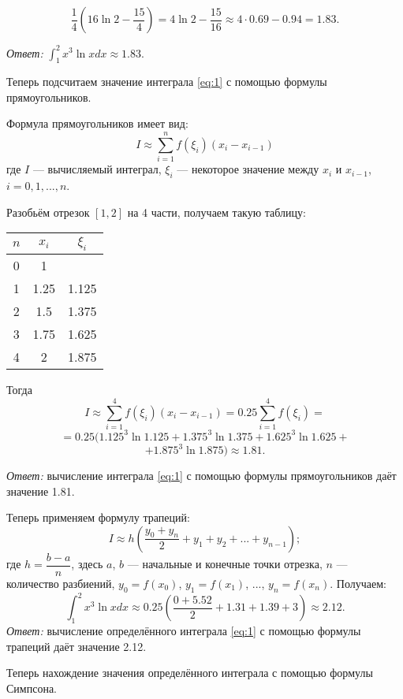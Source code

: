 \documentclass[a4paper, 12pt]{article}
\begin{document}
\begin{enumerate}
{    $$
    \dfrac {1} {4} \left ( 16 \ln 2 - \dfrac {15} {4} \right ) = 4 \ln 2 - \dfrac {15} {16} \approx 4 \cdot 0.69 - 0.94 = 1.83.
    $$

    \emph{Ответ:} $\int_1^2x^3 \ln{x} dx \approx 1.83$.

    Теперь подсчитаем значение интеграла \eqref{eq:1} с помощью формулы прямоугольников.

    Формула прямоугольников имеет вид:
    $$
    I \approx \sum_{i=1}^n f(\xi_i)(x_i - x_{i-1})
    $$
    где $I$ --- вычисляемый интеграл, $\xi_i$ --- некоторое значение между $x_i$ и $x_{i-1}$, $i=0,1,...,n$.

    Разобьём отрезок $[1,2]$ на 4 части, получаем такую таблицу:

    \begin{center}
    \begin{tabular}{|c|c|c|}
      \hline
      $n$ & $x_i$ & $\xi_i$ \\ \hline
      0 & 1 &  \\ \hline
      1 & 1.25 & 1.125 \\ \hline
      2 & 1.5 & 1.375 \\ \hline
      3 & 1.75 & 1.625 \\ \hline
      4 & 2 & 1.875 \\ \hline
    \end{tabular}
    \end{center}

    Тогда
    $$I \approx \sum_{i=1}^4 f(\xi_i)(x_i - x_{i-1}) = 0.25 \sum_{i=1}^4 f(\xi_i) =$$
    $$ = 0.25(1.125^3 \ln 1.125 + 1.375^3 \ln 1.375 + 1.625^3 \ln 1.625 +$$
    $$+1.875^3 \ln 1.875) \approx 1.81.$$

    \emph{Ответ:} вычисление интеграла \eqref{eq:1} с помощью формулы прямоугольников даёт значение 1.81.

    Теперь применяем формулу трапеций:
    $$I \approx h \left ( \dfrac {y_0 + y_n} {2} + y_1 + y_2 + ... + y_{n-1} \right );$$
    где $h = \dfrac {b -a} {n}$, здесь $a$, $b$ --- начальные и конечные точки отрезка, $n$ --- количество разбиений, $y_0 = f(x_0)$, $y_1 = f(x_1)$, ..., $y_{n} = f(x_n)$.
    Получаем:
    $$\int_1^2x^3 \ln{x} dx \approx 0.25 \left ( \dfrac {0 + 5.52} {2} + 1.31 + 1.39 + 3 \right ) \approx 2.12.$$
    \emph{Ответ:} вычисление определённого интеграла \eqref{eq:1} с помощью формулы трапеций даёт значение 2.12.

    Теперь нахождение значения определённого интеграла с помощью формулы Симпсона.

}
\end{enumerate}
\end{document}
